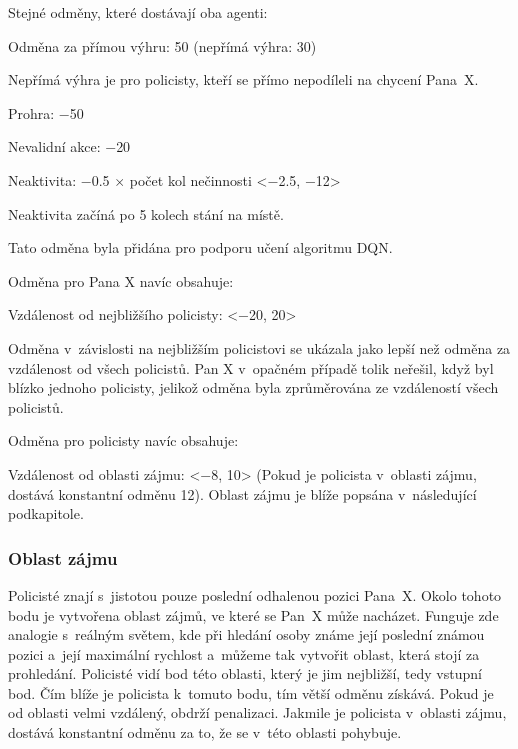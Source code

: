 Stejné odměny, které dostávají oba agenti:
\begin{myitemize}
  \item Odměna za přímou výhru: 50 (nepřímá výhra: 30)
  \begin{myitemize}
    \item Nepřímá výhra je pro policisty, kteří se přímo nepodíleli na chycení Pana~X\@.
  \end{myitemize}
  \item Prohra: $\minus$50
  \item Nevalidní akce: $\minus$20
  \item Neaktivita: $\minus$0.5 $\times$ počet kol nečinnosti <$\minus$2.5, $\minus$12>
  \begin{myitemize}
    \item Neaktivita začíná po 5 kolech stání na místě.
    \item Tato odměna byla přidána pro podporu učení algoritmu DQN\@.
  \end{myitemize}
\end{myitemize}

\bigskip

Odměna pro Pana X navíc obsahuje:
\begin{myitemize}
  \item Vzdálenost od nejbližšího policisty: <$\minus$20, 20>
  \begin{myitemize}
    \item Odměna v~závislosti na nejbližším policistovi se ukázala jako lepší než odměna za vzdálenost od všech policistů.
    Pan X v~opačném případě tolik neřešil, když byl blízko jednoho policisty, jelikož odměna byla zprůměrována ze vzdáleností všech policistů.
  \end{myitemize}
\end{myitemize}

Odměna pro policisty navíc obsahuje:
\begin{myitemize}
  \item Vzdálenost od oblasti zájmu: <$\minus$8, 10> (Pokud je policista v~oblasti zájmu, dostává konstantní odměnu 12).
  Oblast zájmu je blíže popsána v~následující podkapitole.
\end{myitemize}

\subsubsection{Oblast zájmu}
\label{subsubsec:oblast_zajmu}

Policisté znají s~jistotou pouze poslední odhalenou pozici Pana~X\@.
Okolo tohoto bodu je vytvořena oblast zájmů, ve které se Pan~X může nacházet.
Funguje zde analogie s~reálným světem, kde při hledání osoby známe její poslední známou pozici a~její maximální rychlost a~můžeme tak vytvořit oblast, která stojí za prohledání.
Policisté vidí bod této oblasti, který je jim nejbližší, tedy vstupní bod.
Čím blíže je policista k~tomuto bodu, tím větší odměnu získává.
Pokud je od oblasti velmi vzdálený, obdrží penalizaci.
Jakmile je policista v~oblasti zájmu, dostává konstantní odměnu za to, že se v~této oblasti pohybuje.

